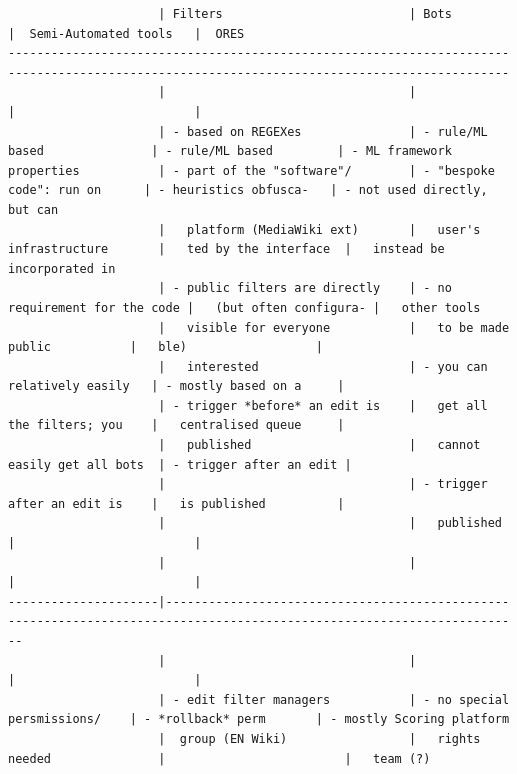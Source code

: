 \begin{verbatim}
                     | Filters                          | Bots                          |  Semi-Automated tools   |  ORES
--------------------------------------------------------------------------------------------------------------------------------------------
                     |                                  |                               |                         |
                     | - based on REGEXes               | - rule/ML based               | - rule/ML based         | - ML framework
properties           | - part of the "software"/        | - "bespoke code": run on      | - heuristics obfusca-   | - not used directly, but can
                     |   platform (MediaWiki ext)       |   user's infrastructure       |   ted by the interface  |   instead be incorporated in
                     | - public filters are directly    | - no requirement for the code |   (but often configura- |   other tools
                     |   visible for everyone           |   to be made public           |   ble)                  |
                     |   interested                     | - you can relatively easily   | - mostly based on a     |
                     | - trigger *before* an edit is    |   get all the filters; you    |   centralised queue     |
                     |   published                      |   cannot easily get all bots  | - trigger after an edit |
                     |                                  | - trigger after an edit is    |   is published          |
                     |                                  |   published                   |                         |
                     |                                  |                               |                         |
---------------------|------------------------------------------------------------------------------------------------------------------------
                     |                                  |                               |                         |
                     | - edit filter managers           | - no special persmissions/    | - *rollback* perm       | - mostly Scoring platform
                     |  group (EN Wiki)                 |   rights needed               |                         |   team (?)

\end{verbatim}
